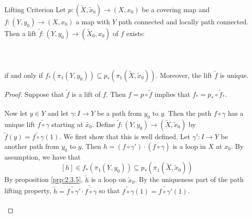 \documentclass[a4paper]{article}
\begin{document}
\begin{thm}{Lifting Criterion}{} Let $p:(\tilde{X},\tilde{x}_0)\to(X,x_0)$ be a covering map and $f:(Y,y_0)\to(X,x_0)$ a map with $Y$ path connected and locally path connected. Then a lift $\tilde{f}:(Y,y_0)\to(\tilde{X}_0,x_0)$ of $f$ exists: \\~\\
\\~\\ 
if and only if $f_\ast(\pi_1(Y,y_0))\subseteq p_\ast(\pi_1(\tilde{X},\tilde{x}_0))$. Moreover, the lift $\tilde{f}$ is unique. \tcbline
\begin{proof}
Suppose that $\tilde{f}$ is a lift of $f$. Then $f=p\circ\tilde{f}$ implies that $f_\ast=p_\ast\circ\tilde{f}_\ast$. \\~\\

Now let $y\in Y$ and let $\gamma:I\to Y$ be a path from $y_0$ to $y$. Then the path $f\circ\gamma$ has a unique lift $\widetilde{f\circ\gamma}$ starting at $\tilde{x_0}$. Define $\tilde{f}:(Y,y_0)\to(\tilde{X},\tilde{x}_0)$ by $\tilde{f}(y)=\widetilde{f\circ\gamma}(1)$. We first show that this is well defined. Let $\gamma':I\to Y$ be another path from $y_0$ to $y$. Then $h=(f\circ\gamma')\cdot(\overline{f\circ\gamma})$ is a loop in $X$ at $x_0$. By assumption, we have that $$[h]\in f_\ast(\pi_1(Y,y_0))\subseteq p_\ast(\pi_1(\tilde{X},\tilde{x}_0))$$ By proposition \ref{prp:2.3.5}, $\tilde{h}$ is a loop on $\tilde{x}_0$. By the uniqueness part of the path lifting property, $\tilde{h}=\widetilde{f\circ\gamma'}\cdot\widetilde{\overline{f\circ\gamma}}$ so that $\widetilde{f\circ\gamma}(1)=\widetilde{f\circ\gamma'}(1)$. \\~\\


\end{proof}
\end{thm}
\end{document}
